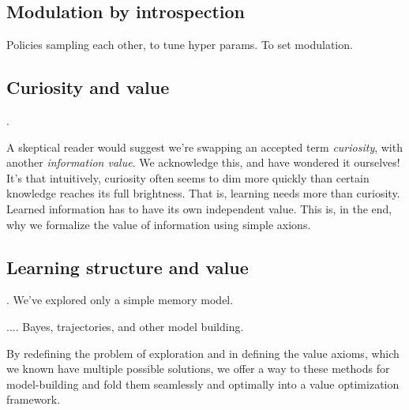 \documentclass[9pt,twocolumn,twoside]{pnas-new}
\begin{document}
\subsection{Modulation by introspection}
Policies sampling each other, to tune hyper params. To set modulation.



\subsection*{Curiosity and value}.

A skeptical reader would suggest we're swapping an accepted term \textit{curiosity}, with another \textit{information value}. We acknowledge this, and have wondered it ourselves! It's that intuitively, curiosity often seems to dim more quickly than certain knowledge reaches its full brightness. That is, learning needs more than curiosity. Learned information has to have its own independent value. This is, in the end, why we formalize the value of information using simple axions. 

\subsection*{Learning structure and value}.
We've explored only a simple memory model. 

.... Bayes, trajectories, and other model building.

By redefining the problem of exploration and in defining the value axioms, which we known have multiple possible solutions, we offer a way to these methods for model-building and fold them seamlessly and optimally into a value optimization framework. 


\end{document}

